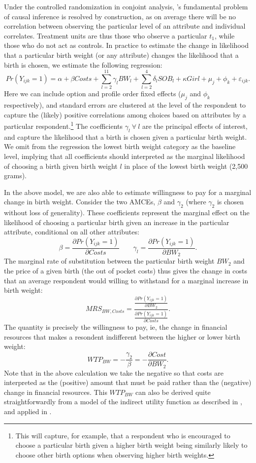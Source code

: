 \documentclass[a4paper, 11pt]{article}
\begin{document}
\begin{spacing}{1.4}
Under the controlled randomization in conjoint analysis, \citet{Holland1986}'s
fundamental problem of causal inference is resolved by construction, as on
average there will be no correlation between observing the particular level
of an attribute and individual correlates. Treatment units are thus those who
observe a particular $t_1$, while those who do not act as controls.  In
practice to estimate the change in likelihood that a particular birth weight
(or any attribute) changes the likelihood that a birth is chosen, we estimate
the following regression:
\begin{equation}
Pr(Y_{ijk}=1) = \alpha + \beta Costs + \sum_{l=2}^{11} \gamma_l BW_l + \sum_{l=2}^{4} \delta_l SOB_l +  \kappa Girl + \mu_j + \phi_k + \varepsilon_{ijk}.
\end{equation}
Here we can include option and profile order fixed effects ($\mu_j$ and
$\phi_k$ respectively), and standard errors are clustered at the level
of the respondent to capture the (likely) positive correlations among
choices based on attributes by a particular respondent.\footnote{This
  will capture, for example, that a respondent who is encouraged to choose
  a particular birth given a higher birth weight being similarly likely to
  choose other birth options when observing higher birth weights.} The
coefficients $\gamma_l \ \forall\ l$ are the principal effects of interest,
and capture the likelihood that a birth is chosen given a particular birth
weight.  We omit from the regression the lowest birth weight category as the
baseline level, implying that all coefficients should interpreted as the
marginal likelihood of choosing a birth given birth weight $l$ in place of
the lowest birth weight (2,500 grams).

In the above model, we are also able to estimate willingness to pay for a
marginal change in birth weight.  Consider the two AMCEs, $\beta$ and $\gamma_2$
(where $\gamma_2$ is chosen without loss of generality).  These coefficients
represent the marginal effect on the likelihood of choosing a particular birth
given an increase in the particular attribute, conditional on all other
attributes:
\[
\beta=\frac{\partial Pr(Y_{ijk}=1)}{\partial Costs} \qquad \gamma_l=\frac{\partial Pr(Y_{ijk}=1)}{\partial BW_2}.
\]
The marginal rate of substitution between the particular birth weight $BW_2$
and the price of a given birth (the out of pocket costs) thus gives the change
in costs that an average respondent would willing to withstand for a marginal
increase in birth weight:
\[
MRS_{BW,Costs}=\frac{\frac{\partial Pr(Y_{ijk}=1)}{\partial BW_2}}{\frac{\partial Pr(Y_{ijk}=1)}{\partial Costs}}.
\]
The quantity is precisely the willingness to pay, ie, the change in financial
resources that makes a resondent indifferent between the higher or lower birth
weight:
\[
WTP_{BW}=-\frac{\gamma_2}{\beta}=-\frac{\partial Cost}{\partial BW_2}.
\]
Note that in the above calculation we take the negative so that costs are
interpreted as the (positive) amount that must be paid rather than the
(negative) change in financial resources.  This $WTP_{BW}$ can also be
derived quite straightforwardly from a model of the indirect utility
function as described in \citet{Zweifeletal2009}, and applied in
\citet{Clarkeetal2016}.


\end{spacing}
\end{document}

